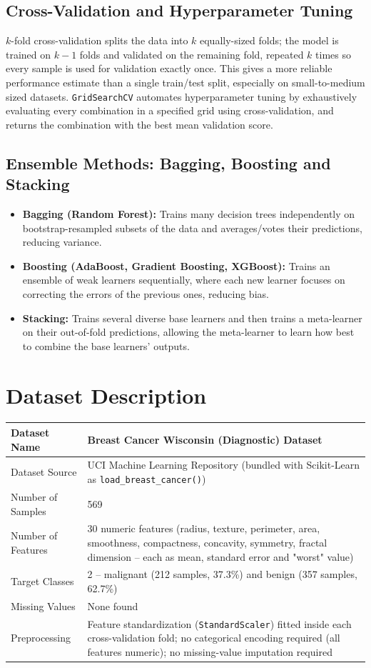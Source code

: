 \documentclass[12pt,a4paper]{article}
\begin{document}
\subsection{Cross-Validation and Hyperparameter Tuning}
$k$-fold cross-validation splits the data into $k$ equally-sized folds; the model is trained on $k-1$ folds and validated on the remaining fold, repeated $k$ times so every sample is used for validation exactly once. This gives a more reliable performance estimate than a single train/test split, especially on small-to-medium sized datasets. \texttt{GridSearchCV} automates hyperparameter tuning by exhaustively evaluating every combination in a specified grid using cross-validation, and returns the combination with the best mean validation score.

\subsection{Ensemble Methods: Bagging, Boosting and Stacking}
\begin{itemize}[leftmargin=*]
    \item \textbf{Bagging (Random Forest):} Trains many decision trees independently on bootstrap-resampled subsets of the data and averages/votes their predictions, reducing variance.
    \item \textbf{Boosting (AdaBoost, Gradient Boosting, XGBoost):} Trains an ensemble of weak learners sequentially, where each new learner focuses on correcting the errors of the previous ones, reducing bias.
    \item \textbf{Stacking:} Trains several diverse base learners and then trains a meta-learner on their out-of-fold predictions, allowing the meta-learner to learn how best to combine the base learners' outputs.
\end{itemize}

\section{Dataset Description}
\begin{longtable}{|p{6cm}|p{8cm}|}
\hline
Dataset Name & Breast Cancer Wisconsin (Diagnostic) Dataset \\ \hline
Dataset Source & UCI Machine Learning Repository (bundled with Scikit-Learn as \texttt{load\_breast\_cancer()}) \\ \hline
Number of Samples & 569 \\ \hline
Number of Features & 30 numeric features (radius, texture, perimeter, area, smoothness, compactness, concavity, symmetry, fractal dimension -- each as mean, standard error and "worst" value) \\ \hline
Target Classes & 2 -- malignant (212 samples, 37.3\%) and benign (357 samples, 62.7\%) \\ \hline
Missing Values & None found \\ \hline
Preprocessing & Feature standardization (\texttt{StandardScaler}) fitted inside each cross-validation fold; no categorical encoding required (all features numeric); no missing-value imputation required \\ \hline
\end{longtable}
\end{document}
